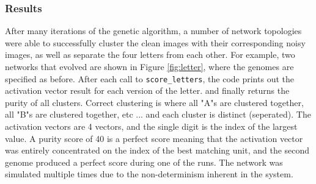 \documentclass[12pt,a4paper]{article}
\begin{document}
\subsubsection{Results}
After many iterations of the genetic algorithm, a number of network topologies were able to successfully cluster the clean images with their corresponding noisy images, as well as separate the four letters from each other.  For example, two networks that evolved are shown in Figure \ref{fig:letter}, where the genomes are specified as before.  After each call to \texttt{score\_letters}, the code prints out the activation vector result for each version of the letter. and finally returns the purity of all clusters.  Correct clustering is where all "A"s are clustered together, all "B"s are clustered together, etc ... and each cluster is distinct (seperated).  The activation vectors are 4 vectors, and the single digit is the index of the largest value.  A purity score of 40 is a perfect score meaning that the activation vector was entirely concentrated on the index of the best matching unit, and the second genome produced a perfect score during one of the runs.  The network was simulated multiple times due to the non-determinism inherent in the system.
\end{document}
